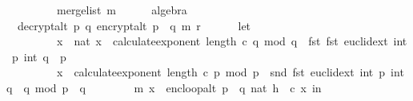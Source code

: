 \begin{isabellebody}
\ \ \ \ \ \ \ \ \ merge{\isacharunderscore}{\kern0pt}list\ m{\isacharparenright}{\kern0pt}{\isachardoublequoteclose}\isanewline
\ \ \ \ \isamarkupfalse%
\ algebra\isanewline
\isanewline
\ \ \isamarkupfalse%
\ \isamarkupfalse%
\ \ {\isachardoublequoteopen}decrypt{\isacharunderscore}{\kern0pt}alt\ p\ q\ {\isacharparenleft}{\kern0pt}encrypt{\isacharunderscore}{\kern0pt}alt\ {\isacharparenleft}{\kern0pt}p\ {\isacharasterisk}{\kern0pt}\ q{\isacharparenright}{\kern0pt}\ m\ r{\isacharparenright}{\kern0pt}\ {\isacharequal}{\kern0pt}\ \isanewline
\ \ \ \ {\isacharparenleft}{\kern0pt}let\ \isanewline
\ \ \ \ \ \ \ \ \ x{\isacharunderscore}{\kern0pt}{}\ {\isacharequal}{\kern0pt}\ nat\ {\isacharparenleft}{\kern0pt}{\isacharparenleft}{\kern0pt}{\isacharparenleft}{\kern0pt}x\ {\isacharcircum}{\kern0pt}\ {\isacharparenleft}{\kern0pt}calculate{\isacharunderscore}{\kern0pt}exponent\ {\isacharparenleft}{\kern0pt}length\ c{\isacharparenright}{\kern0pt}\ q{\isacharparenright}{\kern0pt}\ mod\ q{\isacharparenright}{\kern0pt}\ {\isacharasterisk}{\kern0pt}\ fst\ {\isacharparenleft}{\kern0pt}fst\ {\isacharparenleft}{\kern0pt}euclid{\isacharunderscore}{\kern0pt}ext\ {\isacharparenleft}{\kern0pt}int\ p{\isacharparenright}{\kern0pt}\ {\isacharparenleft}{\kern0pt}int\ q{\isacharparenright}{\kern0pt}{\isacharparenright}{\kern0pt}{\isacharparenright}{\kern0pt}\ {\isacharasterisk}{\kern0pt}\ p\ \isanewline
\ \ \ \ \ \ \ \ {\isacharplus}{\kern0pt}\ {\isacharparenleft}{\kern0pt}x\ {\isacharcircum}{\kern0pt}\ {\isacharparenleft}{\kern0pt}calculate{\isacharunderscore}{\kern0pt}exponent\ {\isacharparenleft}{\kern0pt}length\ c{\isacharparenright}{\kern0pt}\ p{\isacharparenright}{\kern0pt}\ mod\ p{\isacharparenright}{\kern0pt}\ {\isacharasterisk}{\kern0pt}\ snd\ {\isacharparenleft}{\kern0pt}fst\ {\isacharparenleft}{\kern0pt}euclid{\isacharunderscore}{\kern0pt}ext\ {\isacharparenleft}{\kern0pt}int\ p{\isacharparenright}{\kern0pt}\ {\isacharparenleft}{\kern0pt}int\ q{\isacharparenright}{\kern0pt}{\isacharparenright}{\kern0pt}{\isacharparenright}{\kern0pt}\ {\isacharasterisk}{\kern0pt}\ q{\isacharparenright}{\kern0pt}\ mod\ {\isacharparenleft}{\kern0pt}p\ {\isacharasterisk}{\kern0pt}\ q{\isacharparenright}{\kern0pt}{\isacharparenright}{\kern0pt}{\isacharsemicolon}{\kern0pt}\isanewline
\ \ \ \ \ \ \ \ {\isacharparenleft}{\kern0pt}m{\isacharcomma}{\kern0pt}\ x{\isacharprime}{\kern0pt}{\isacharparenright}{\kern0pt}\ {\isacharequal}{\kern0pt}\ enc{\isacharunderscore}{\kern0pt}loop{\isacharunderscore}{\kern0pt}alt\ {\isacharparenleft}{\kern0pt}p\ {\isacharasterisk}{\kern0pt}\ q{\isacharcomma}{\kern0pt}\ {\isacharparenleft}{\kern0pt}nat\ h{\isacharparenright}{\kern0pt}\ {\isacharcomma}{\kern0pt}\ c{\isacharparenright}{\kern0pt}\ x{\isacharunderscore}{\kern0pt}{}\ in\isanewline

\end{isabellebody}
